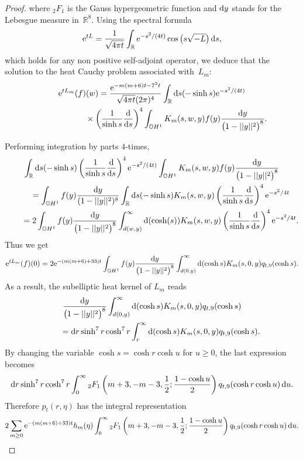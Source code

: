 \documentclass[10pt,a4paper]{amsart}
\numberwithin{equation}{section}
\begin{document}
\begin{proof}
where $_2 F_{1}$ is the Gauss hypergeometric function and ${\rm d}y$ stands for the Lebesgue measure in~$\mathbb{R}^8$. Using the spectral formula
\begin{equation*}
{\rm e}^{tL}=\frac{1}{\sqrt{4\pi t}}\int_{\mathbb{R}}{\rm e}^{-s^2/(4t)}\cos\big(s\sqrt{-L}\big)\,{\rm d}s,
\end{equation*}
which holds for any non positive self-adjoint operator, we deduce that the solution to the heat Cauchy problem associated with~$L_m$:
\begin{gather*}
{\rm e}^{t L_m}(f)(w) =\frac{{\rm e}^{-m(m+6)t-7^2 t}}{\sqrt{4\pi t}(2\pi)^{4}}
\int_{\mathbb{R}} {\rm d}s (-\sinh s){\rm e}^{-s^2/(4t)}\\
\hphantom{{\rm e}^{t L_m}(f)(w) =}{}\times \left(\frac{1}{\sinh s}\frac{{\rm d}}{{\rm d}s}\right)^{4} \int_{\mathbb{O}H^1} K_m(s,w,y)f(y)\frac{{\rm d}y}{\big(1-||y||^2\big)^{8}}.
\end{gather*}

Performing integration by parts $4$-times,
\begin{gather*}
\int_{\mathbb{R}} {\rm d}s (-\sinh s)\left(\frac{1}{\sinh s}\frac{{\rm d}}{{\rm d}s}\right)^{4} {\rm e}^{-s^2/(4t)} \int_{\mathbb{O}H^1} K_m(s,w,y)f(y)\frac{{\rm d}y}{\big(1-||y||^2\big)^{8}}
\\
\qquad{}=\int_{\mathbb{O}H^1}f(y)\frac{{\rm d}y}{(1-||y||^2)^{8}} \int_{\mathbb{R}} {\rm d}s (-\sinh s)K_m(s,w,y)\left(\frac{1}{\sinh s }\frac{{\rm d}}{{\rm d}s}\right)^{4}{\rm e}^{-s^2/4t}
\\
\qquad{} =2\int_{\mathbb{O}H^1}f(y)\frac{{\rm d}y}{\big(1-||y||^2\big)^{8}} \int_{d(w,y)}^{\infty}{\rm d}(\cosh(s))K_m(s,w,y)\left(\frac{1}{\sinh s }\frac{{\rm d}}{{\rm d}s}\right)^{4}{\rm e}^{-s^2/4t}.
\end{gather*}
Thus we get
\begin{equation*}
{\rm e}^{tL_m}(f)(0)=2 {\rm e}^{-(m(m+6)+33)t}\int_{\mathbb{O}H^1} f(y)\frac{{\rm d}y}{\big(1-||y||^2\big)^{8}}\int_{d(0,y)}^{\infty}{\rm d}(\cosh s)K_m(s,0,y)q_{t,9}(\cosh s).
\end{equation*}
As a result, the subelliptic heat kernel of $L_m$ reads
\begin{gather*}
\frac{{\rm d}y}{\big(1-||y||^2\big)^{8}}\int_{d(0,y)}^{\infty}{\rm d}(\cosh s)K_m(s,0,y)q_{t,9}(\cosh s)
\\
\qquad{} ={\rm d}r \sinh^{7}r\cosh^7 r\int_{r}^{\infty}{\rm d}(\cosh s)K_m(s,0,y)q_{t,9}(\cosh s).
\end{gather*}
By changing the variable $\cosh s=\cosh r \cosh u$ for $u\geq 0$, the last expression becomes
\begin{equation*}
{\rm d}r \sinh^{7}r\cosh^7 r\int_{0}^{\infty} {_2} F_{1}\left(m+3,-m-3,\frac{1}{2};\frac{1-\cosh u }{2 }\right) q_{t,9}(\cosh r\cosh u)\,{\rm d}u.
\end{equation*}
Therefore $p_t(r,\eta)$ has the integral representation
\begin{equation*}
2\sum_{m\geq 0}{\rm e}^{-(m(m+6)+33)t}h_m(\eta) \int_{0}^{\infty} {_2} F_{1}\left(m+3,-m-3,\frac{1}{2};\frac{1-\cosh u }{2 }\right) q_{t,9}(\cosh r \cosh u)\,{\rm d}u.
\end{equation*}


\end{proof}
\end{document}
